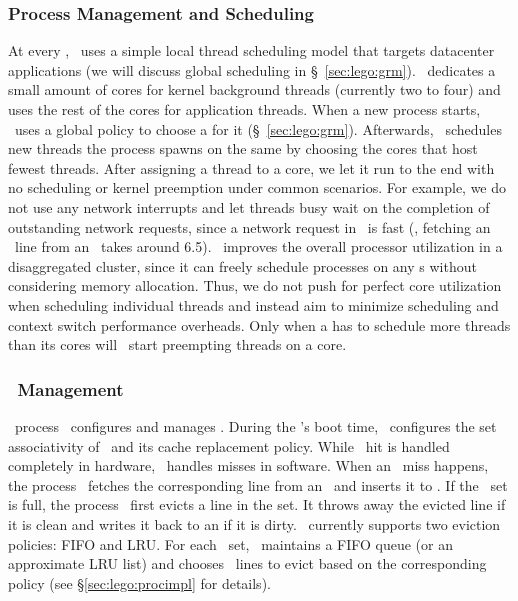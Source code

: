 \subsubsection{Process Management and Scheduling}
\label{sec:lego:proc-scheduling}
At every \pcomponent, \lego\ uses a simple local thread scheduling model 
that targets datacenter applications 
(we will discuss global scheduling in \S~\ref{sec:lego:grm}).
\lego\ dedicates a small amount of cores for kernel background threads 
(currently two to four)
and uses the rest of the cores for application threads.
When a new process starts, \lego\ uses a global policy to choose a \pcomponent{} for it (\S~\ref{sec:lego:grm}).
Afterwards, \lego\ schedules new threads the process spawns on the same \pcomponent{} 
by choosing the cores that host fewest threads.
After assigning a thread to a core, 
we let it run to the end with no scheduling or kernel preemption under common scenarios.
For example, we do not use any network interrupts 
and let threads busy wait on the completion of outstanding network requests, 
since a network request in \lego\ is fast 
(\eg, fetching an \excache\ line from an \mcomponent\ takes around 6.5\mus).
\lego\ improves the overall processor utilization in a disaggregated cluster,
since it can freely schedule processes on any \pcomponent{}s without considering memory allocation.
Thus, we do not push for perfect core utilization when scheduling individual threads
and instead aim to minimize scheduling and context switch performance overheads.
Only when a \pcomponent{} has to schedule 
more threads than its cores will
\lego\ start preempting threads on a core.

\subsubsection{\excache\ Management}
\label{sec:lego:excachemgmt}
\lego\ process \microos\ configures and manages \excache.
During the \pcomponent{}'s boot time, \lego\ configures the set associativity of \excache\
and its cache replacement policy.
While \excache\ hit is handled completely in hardware, 
\lego\ handles misses in software.
When an \excache\ miss happens, 
the process \microos\ fetches the corresponding line from an \mcomponent\ and inserts it to \excache.
If the \excache\ set is full, the process \microos\ first evicts a line in the set.
It throws away the evicted line if it is clean
and writes it back to an \mcomponent{} if it is dirty.
\lego\ currently supports two eviction policies: FIFO and LRU.
For each \excache\ set, \lego\ maintains a FIFO queue (or an approximate LRU list)
and chooses \excache\ lines to evict based on the corresponding policy (see \S\ref{sec:lego:procimpl} for details).

